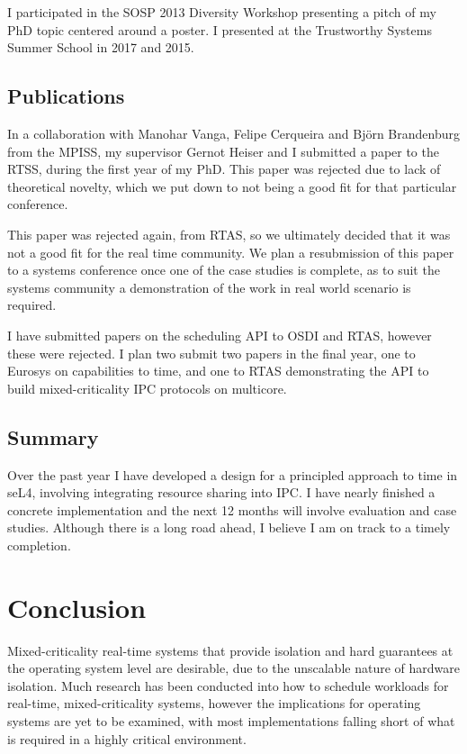 I participated in the \gls{SOSP} 2013 Diversity Workshop presenting a pitch of my PhD topic centered around a poster.
I presented at the Trustworthy Systems Summer School in 2017 and 2015.

\subsection{Publications}

In a collaboration with Manohar Vanga, Felipe Cerqueira and Bj\"{o}rn Brandenburg from the \gls{MPISS}, my supervisor Gernot Heiser and I submitted a paper to the RTSS, during the first year of my PhD.
This paper was rejected due to lack of theoretical novelty, which we put down to not being a good fit for that particular conference.

This paper was rejected again, from \gls{RTAS}, so we ultimately decided that it was not a good fit for the real time community.
We plan a resubmission of this paper to a systems conference once one of the case studies is complete, as to suit the systems community a demonstration of the work in real world scenario is required.

I have submitted papers on the scheduling  API to OSDI and \gls{RTAS}, however these were rejected.
I plan two submit two papers in the final year, one to Eurosys on capabilities to time, and one to \gls{RTAS} demonstrating the API to build mixed-criticality IPC protocols on multicore.

\subsection{Summary}

Over the past year I have developed a design for a principled approach to time in seL4, involving integrating resource sharing into \gls{IPC}.
I have nearly finished a concrete implementation and the next 12 months will involve evaluation and case studies.
Although there is a long road ahead, I believe I am on track to a timely completion.

\section{Conclusion}

Mixed-criticality real-time systems that provide isolation and hard guarantees at the operating system level are desirable, due to the unscalable nature of hardware isolation.
Much research has been conducted into how to schedule workloads for real-time, mixed-criticality systems, however the implications for operating systems are yet to be examined, with most implementations falling short of what is required in a highly critical environment.

